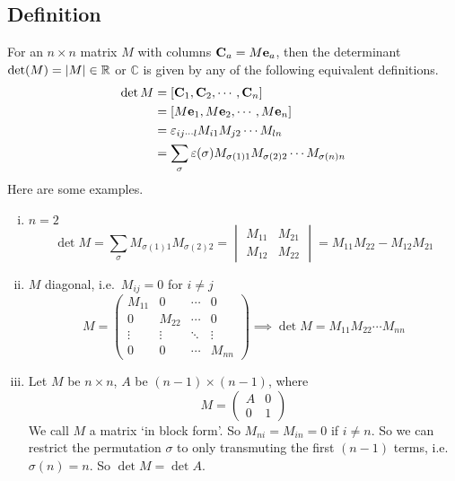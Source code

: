 \subsection{Definition}
For an \(n \times n\) matrix \(M\) with columns \(\vb C_a = M\vb e_a\), then the determinant \(\det(M) = \abs{M} \in \mathbb R\) or \(\mathbb C\) is given by any of the following equivalent definitions.
\begin{align*}
	\det M
	 & = [\vb C_1, \vb C_2, \cdots, \vb C_n]                                                \\
	 & = [M\vb e_1, M\vb e_2, \cdots, M\vb e_n]                                             \\
	 & = \varepsilon_{ij\cdots l}M_{i1}M_{j2} \cdots M_{l n}                                \\
	 & = \sum_\sigma \varepsilon(\sigma) M_{\sigma(1)1}M_{\sigma(2)2} \cdots M_{\sigma(n)n}
\end{align*}
Here are some examples.
\begin{enumerate}[(i)]
	\item \(n=2\)
	      \[
		      \det M = \sum_\sigma M_{\sigma(1)1}M_{\sigma(2)2} = \begin{vmatrix}
			      M_{11} & M_{21} \\ M_{12} & M_{22}
		      \end{vmatrix} = M_{11}M_{22} - M_{12}M_{21}
	      \]
	\item \(M\) diagonal, i.e.\ \(M_{ij} = 0\) for \(i \neq j\)
	      \[
		      M = \begin{pmatrix}
			      M_{11} & 0      & \cdots & 0      \\
			      0      & M_{22} & \cdots & 0      \\
			      \vdots & \vdots & \ddots & \vdots \\
			      0      & 0      & \cdots & M_{nn}
		      \end{pmatrix} \implies \det M = M_{11}M_{22}\cdots M_{nn}
	      \]
	\item Let \(M\) be \(n\times n\), \(A\) be \((n-1) \times (n-1)\), where
	      \[
		      M = \left( \begin{array}{c|c}
				      A & 0 \\\hline
				      0 & 1
			      \end{array} \right)
	      \]
	      We call \(M\) a matrix `in block form'.
	      So \(M_{ni} = M_{in} = 0\) if \(i \neq n\).
	      So we can restrict the permutation \(\sigma\) to only transmuting the first \((n-1)\) terms, i.e.\ \(\sigma(n) = n\).
	      So \(\det M = \det A\).
\end{enumerate}

